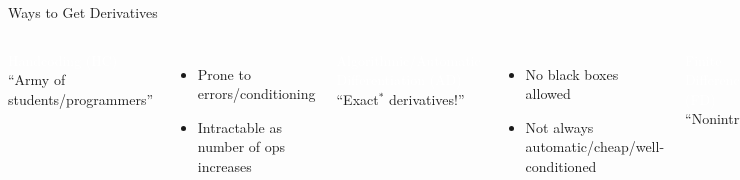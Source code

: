 \documentclass[handout,aspectratio=54]{beamer}
\numberwithin{theorem}{section}
\begin{document}
\begin{frame}{Ways to Get Derivatives}
\begin{columns}
\colorbox[rgb]{0.5,0.6,0.7}{\textcolor{white}{Handcoding (HC)}}\\
\vspace{0.1cm} 
“Army of students/programmers”
\begin{itemize}\footnotesize
\item[\textcolor{red}{?}] Prone to errors/conditioning
\item[\textcolor{red}{?}] Intractable as number of ops increases
\end{itemize}

\colorbox[rgb]{0.5,0.6,0.7}{\textcolor{white}{Algorithmic/Automatic Differentiation (AD)}}\\
\vspace{0.1cm} 
“Exact$^*$ derivatives!”
\begin{itemize}\footnotesize
\item[\textcolor{red}{?}]  No black boxes allowed
\item[\textcolor{red}{?}]  Not always automatic/cheap/well-conditioned
\end{itemize}

\colorbox[rgb]{0.5,0.6,0.7}{\textcolor{white}{Finite Differences (FD)}}\\
\vspace{0.1cm} 
“Nonintrusive”
\begin{itemize}\footnotesize
\item[\textcolor{red}{?}]  Expense grows with $n$
\item[\textcolor{red}{?}]  Sensitive to stepsize choice/noise
\end{itemize}

\scriptsize{\textcolor{blue}{(assuming they exist)}}


\end{columns}
\end{frame}
\end{document}
